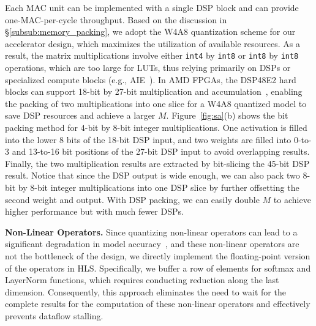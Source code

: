 Each MAC unit can be implemented with a single DSP block and can provide one-MAC-per-cycle throughput.
Based on the discussion in \S\ref{subsub:memory_packing}, we adopt the W4A8 quantization scheme for our accelerator design, which maximizes the utilization of available resources.
As a result, the matrix multiplications involve either \texttt{int4} by \texttt{int8} or \texttt{int8} by \texttt{int8} operations, which are too large for LUTs, thus relying primarily on DSPs or specialized compute blocks (e.g., AIE~\cite{xilinxAIE}).
In AMD FPGAs, the DSP48E2 hard blocks can support 18-bit by 27-bit multiplication and accumulation~\cite{u280}, enabling the packing of two multiplications into one slice for a W4A8 quantized model to save DSP resources and achieve a larger $M$.
Figure~\ref{fig:sa}(b) shows the bit packing method for 4-bit by 8-bit integer multiplications.
One activation is filled into the lower 8 bits of the 18-bit DSP input, and two weights are filled into 0-to-3 and 13-to-16 bit positions of the 27-bit DSP input to avoid overlapping results.
Finally, the two multiplication results are extracted by bit-slicing the 45-bit DSP result.
Notice that since the DSP output is wide enough, we can also pack two 8-bit by 8-bit integer multiplications into one DSP slice by further offsetting the second weight and output.
With DSP packing, we can easily double $M$ to achieve higher performance but with much fewer DSPs.



\noindent\textbf{Non-Linear Operators.}
Since quantizing non-linear operators can lead to a significant degradation in model accuracy~\cite{sheng2020qbert,xiao2023smoothquant}, and these non-linear operators are not the bottleneck of the design, we directly implement the floating-point version of the operators in HLS.
Specifically, we buffer a row of elements for softmax and LayerNorm functions, which requires conducting reduction along the last dimension.
Consequently, this approach eliminates the need to wait for the complete results for the computation of these non-linear operators and effectively prevents dataflow stalling.

